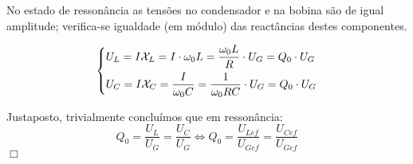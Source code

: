 No estado de ressonância as tensões no condensador e na bobina são de igual amplitude; verifica-se igualdade (em módulo) das reactâncias destes componentes.

$$
\begin{dcases*}
U_L = I \mathcal{X}_L = I\cdot \omega_0 L = \frac{\omega_0 L}{R}\cdot U_G = Q_0\cdot U_G\\
U_C = I \mathcal{X}_C = \frac{I}{\omega_0 C} = \frac{1}{\omega_0 RC}\cdot U_G = Q_0\cdot U_G
\end{dcases*}
$$

Justaposto, trivialmente concluímos que em ressonância: 
$$ 
Q_0 = \dfrac{U_L}{U_G} = \dfrac{U_C}{U_G} \iff Q_0 = \dfrac{U_{Lef}}{U_{Gef}} = \dfrac{U_{Cef}}{U_{Gef}}
$$
\hfill \ensuremath{\Box}
